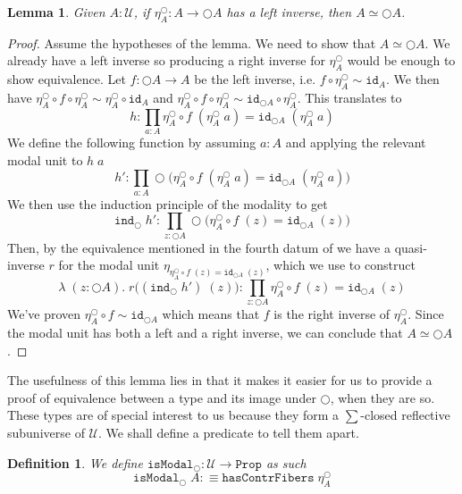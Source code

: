 \documentclass[12pt]{report}
\newtheorem{lem}[thm]{Lemma}
\newtheorem{defn}[thm]{Definition}
\theoremstyle{definition}
\begin{document}
\begin{lem}\label{modalUnitLeftInverse}
Given $A : \mathcal{U}$, if $\eta^\bigcirc_A : A \rightarrow \bigcirc A$ has a left inverse, then $A \simeq \bigcirc A$. 
\end{lem}
\begin{proof}
Assume the hypotheses of the lemma. 
We need to show that $A \simeq \bigcirc A$. 
We already have a left inverse so producing a right inverse for $\eta^\bigcirc_A$ would be enough to show equivalence. 
Let $f : \bigcirc A \rightarrow A$ be the left inverse, i.e. $f \circ \eta^\bigcirc_A \sim \mathtt{id}_A$. 
We then have $\eta^\bigcirc_A \circ f \circ \eta^\bigcirc_A \sim \eta^\bigcirc_A \circ \mathtt{id}_A$ and 
$\eta^\bigcirc_A \circ f \circ \eta^\bigcirc_A \sim \mathtt{id}_{\bigcirc A} \circ \eta^\bigcirc_A$. 
This translates to
$$h : \prod_{a : A}\eta^\bigcirc_A \circ f \;(\eta^\bigcirc_A\; a) = \mathtt{id}_{\bigcirc A} \; (\eta^\bigcirc_A\; a)$$
We define the following function by assuming $a : A$ and applying the relevant modal unit to $h\;a$ 
$$h' : \prod_{a : A}\bigcirc\big(\eta^\bigcirc_A \circ f \;(\eta^\bigcirc_A\; a) = \mathtt{id}_{\bigcirc A} \; (\eta^\bigcirc_A\; a) \big)$$
We then use the induction principle of the modality to get
$$\mathtt{ind}_{\bigcirc}\; h' : \prod_{z : \bigcirc A}\bigcirc\big(\eta^\bigcirc_A \circ f \;(z) = \mathtt{id}_{\bigcirc A} \; (z) \big)$$
Then, by the equivalence mentioned in the fourth datum of  we have a quasi-inverse $r$ for the modal unit $\eta_{\eta^\bigcirc_A \circ f \;(z) = \mathtt{id}_{\bigcirc A} \; (z)}$, 
which we use to construct
$$ \lambda\;(z : \bigcirc A).\; r \big((\mathtt{ind}_{\bigcirc}\; h')\;(z)\big) : \prod_{z : \bigcirc A}\eta^\bigcirc_A \circ f \;(z) = \mathtt{id}_{\bigcirc A} \; (z) $$
We've proven $\eta^\bigcirc_A \circ f \sim \mathtt{id}_{\bigcirc A}$ which means that $ f$ is the right inverse of $\eta_A^\bigcirc$. 
Since the modal unit has both a left and a right inverse, we can conclude that $A \simeq \bigcirc A$. 
\end{proof}
The usefulness of this lemma lies in that it makes it easier for us to provide a proof of equivalence between a type and its image under $\bigcirc$, when they are so. 
These types are of special interest to us because they form a $\sum$-closed reflective subuniverse of $\mathcal{U}$. 
We shall define a predicate to tell them apart. 
\begin{defn}
We define $\mathtt{isModal}_{\bigcirc} : \mathcal{U} \rightarrow \mathtt{Prop}$ as such
$$\mathtt{isModal}_{\bigcirc}\; A :\equiv \mathtt{hasContrFibers}\; \eta_A^\bigcirc$$
\end{defn}
\end{document}
